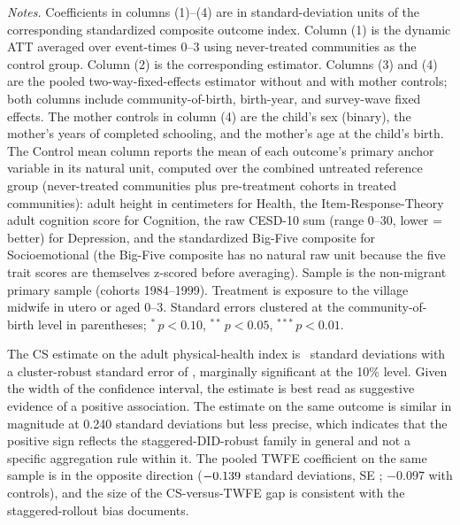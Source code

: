 \begin{table}[!htbp] \centering \caption{Main results: effect of early-life village-midwife exposure on adult outcome indices.} \label{tab:main_results}  \begin{minipage}{0.97\textwidth} \footnotesize \emph{Notes.} Coefficients in columns (1)--(4) are in standard-deviation units of the corresponding standardized composite outcome index. Column (1) is the \textcite{callawaysantanna2021} dynamic ATT averaged over event-times $0$--$3$ using never-treated communities as the control group. Column (2) is the corresponding \textcite{dechaisemartin2021} estimator. Columns (3) and (4) are the pooled two-way-fixed-effects estimator without and with mother controls; both columns include community-of-birth, birth-year, and survey-wave fixed effects. The mother controls in column (4) are the child's sex (binary), the mother's years of completed schooling, and the mother's age at the child's birth. The Control mean column reports the mean of each outcome's primary anchor variable in its natural unit, computed over the combined untreated reference group (never-treated communities plus pre-treatment cohorts in treated communities): adult height in centimeters for Health, the Item-Response-Theory adult cognition score for Cognition, the raw CESD-10 sum (range 0--30, lower = better) for Depression, and the standardized Big-Five composite for Socioemotional (the Big-Five composite has no natural raw unit because the five trait scores are themselves z-scored before averaging). Sample is the non-migrant primary sample (cohorts 1984--1999). Treatment is exposure to the village midwife in utero or aged 0--3. Standard errors clustered at the community-of-birth level in parentheses; $^{*}\,p<0.10$, $^{**}\,p<0.05$, $^{***}\,p<0.01$. \end{minipage} \end{table}

The CS estimate on the adult physical-health index is \CoefHealthCS\ standard deviations with a cluster-robust standard error of \SEHealthCS, marginally significant at the 10\% level. Given the width of the confidence interval, the estimate is best read as suggestive evidence of a positive association. The \textcite{dechaisemartin2021} estimate on the same outcome is similar in magnitude at 0.240 standard deviations but less precise, which indicates that the positive sign reflects the staggered-DID-robust family in general and not a specific aggregation rule within it. The pooled TWFE coefficient on the same sample is in the opposite direction ($-0.139$ standard deviations, SE \SEHealthTWFE; $-0.097$ with controls), and the size of the CS-versus-TWFE gap is consistent with the staggered-rollout bias \textcite{goodmanbacon2021} documents.

